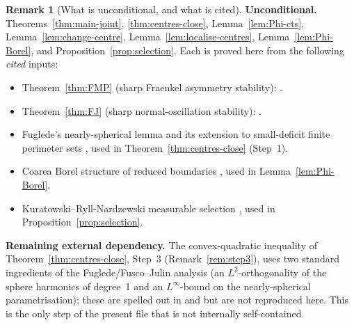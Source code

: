 \documentclass[11pt]{article}
\theoremstyle{definition}
\newtheorem{remark}[theorem]{Remark}
\begin{document}
\begin{remark}[What is unconditional, and what is cited]
\label{rem:status}
\textbf{Unconditional.}  Theorems~\ref{thm:main-joint},
\ref{thm:centres-close}, Lemma~\ref{lem:Phi-cts},
Lemma~\ref{lem:change-centre},
Lemma~\ref{lem:localise-centres}, Lemma~\ref{lem:Phi-Borel}, and
Proposition~\ref{prop:selection}.  Each is proved here from the
following \emph{cited} inputs:
\begin{itemize}
\item Theorem~\ref{thm:FMP} (sharp Fraenkel asymmetry stability):
   \cite{FigalliMaggiPratelli2010,FuscoMaggiPratelli2008}.
\item Theorem~\ref{thm:FJ} (sharp normal-oscillation stability):
   \cite{FuscoJulin2014}.
\item Fuglede's nearly-spherical lemma
   \cite{Fuglede1989} and its extension to small-deficit finite
   perimeter sets \cite[Theorem~3.4]{CicaleseLeonardi2012},
   used in Theorem~\ref{thm:centres-close} (Step~1).
\item Coarea Borel structure of reduced boundaries
   \cite[\S15]{Maggi2012}, used in Lemma~\ref{lem:Phi-Borel}.
\item Kuratowski--Ryll-Nardzewski measurable selection
   \cite[Theorem~III.6, III.30]{CastaingValadier1977}, used in
   Proposition~\ref{prop:selection}.
\end{itemize}
\textbf{Remaining external dependency.}  The convex-quadratic
inequality of Theorem~\ref{thm:centres-close}, Step~3
(Remark~\ref{rem:step3}), uses two standard ingredients of the
Fuglede/Fusco--Julin analysis (an \(L^{2}\)-orthogonality of the
sphere harmonics of degree~1 and an \(L^{\infty}\)-bound on the
nearly-spherical parametrisation); these are spelled out in
\cite[Sec.~2--3]{FuscoJulin2014} and
\cite[Sec.~3]{CicaleseLeonardi2012} but are not reproduced here.
This is the only step of the present file that is not internally
self-contained.
\end{remark}
\end{document}
